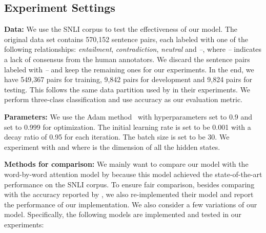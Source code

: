 \documentclass[11pt,letterpaper]{article}
\begin{document}
\subsection{Experiment Settings}

\noindent \textbf{Data:} We use the SNLI corpus to test the effectiveness of our model.
The original data set contains 570,152 sentence pairs, each labeled with one of the following relationships: \emph{entailment}, \emph{contradiction}, \emph{neutral} and \emph{--}, where \emph{--} indicates a lack of consensus from the human annotators.
We discard the sentence pairs labeled with \emph{--} and keep the remaining ones for our experiments.
In the end, we have 549,367 pairs for training, 9,842 pairs for development and 9,824 pairs for testing.
This follows the same data partition used by  in their experiments.
We perform three-class classification and use accuracy as our evaluation metric.



\noindent \textbf{Parameters:} We use the Adam method~\cite{kingma:arxiv14} with hyperparameters  set to 0.9 and  set to 0.999 for optimization.
The initial learning rate is set to be 0.001 with a decay ratio of 0.95 for each iteration.
The batch size is set to be 30.
We experiment with  and  where  is the dimension of all the hidden states.


\noindent \textbf{Methods for comparison:} We mainly want to compare our model with the word-by-word attention model by  because this model achieved the state-of-the-art performance on the SNLI corpus.
To ensure fair comparison, besides comparing with the accuracy reported by , we also re-implemented their model and report the performance of our implementation.
We also consider a few variations of our model.
Specifically, the following models are implemented and tested in our experiments:
\end{document}
